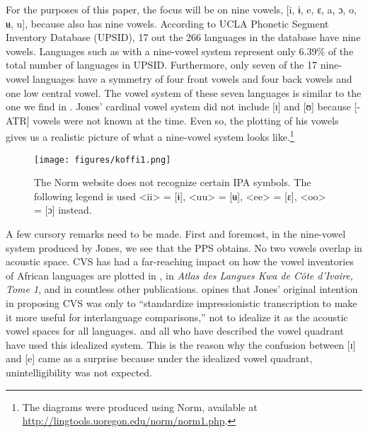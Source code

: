 \documentclass[output=paper,
modfonts
]{langscibook}
\begin{document}
{For the purposes of this paper, the focus will be on nine vowels, [i, ɨ, e, ɛ, a, ɔ, o,} {ʉ}{, u], because  also has nine vowels. According to  UCLA Phonetic Segment Inventory Database (UPSID), 17 out the 266 languages in the database have nine vowels. Languages such as  with a nine-vowel system represent only 6.39\% of the total number of languages in UPSID. Furthermore, only seven of the 17 nine-vowel languages have a  symmetry of four front vowels and four back vowels and one low central vowel. The vowel system of these seven languages is similar to the one we find in . Jones’ cardinal vowel system did not include [ɪ] and [ʊ] because [-ATR] vowels were not known at the time. Even so, the plotting of his vowels gives us a realistic picture of what a nine-vowel system looks like.}\footnote { {} The diagrams were produced using Norm, available at \url{ http://lingtools.uoregon.edu/norm/norm1.php}. } {}


\begin{figure}  
\texttt{[image: figures/koffi1.png]}
\caption[Jones’ Acoustic Vowel Space]{The Norm website does not recognize certain IPA symbols.  The following legend is used 
<ii> = [ɨ],  
<uu> = [ʉ],
<ee> = [ɛ], 
<oo> = [ɔ] instead.}
\label{fig:koffi:1}
\end{figure}

A few cursory remarks need to be made. First and foremost, in the nine-vowel system produced by Jones, we see that the PPS obtains. No two vowels overlap in acoustic space. CVS has had a far-reaching impact on how the vowel inventories of African languages are plotted in \citet[20--45]{Welmers1973}, in \textit{Atlas des Langues Kwa de Côte d’Ivoire, Tome 1}, and in countless other publications. \citet[145--147]{Thomas2011} opines that Jones’ original intention in proposing CVS was only to “standardize impressionistic transcription to make it more useful for interlanguage comparisons,” not to idealize it as the acoustic vowel spaces for all languages. \citet{Koffi2009} and all who have described the  vowel quadrant have used this idealized system. This is the reason why the confusion between [ɪ] and [e] came as a surprise because under the idealized  vowel quadrant, unintelligibility was not expected. 
\end{document}

